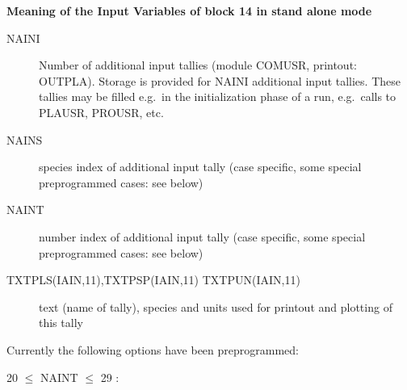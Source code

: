 \textbf{Meaning of the Input Variables of block 14 in stand alone mode}

\medskip 

\begin{description}
  \item[NAINI] Number of additional input tallies (module
        COMUSR, printout:
        OUTPLA).
        Storage is provided for NAINI additional input tallies.
        These tallies may be filled e.g.\ in the initialization phase of a run, e.g.\
        calls to PLAUSR, PROUSR, etc.
  \item[NAINS] species index of additional input
        tally (case specific, some special preprogrammed cases: see below)
  \item[NAINT]
        number index of additional input tally (case specific, some special
        preprogrammed cases: see below)
  \item[TXTPLS(IAIN,11),TXTPSP(IAIN,11)
        TXTPUN(IAIN,11)] text (name of tally), species and units used for printout and
        plotting of this tally
\end{description}
Currently the following options have
been preprogrammed:

20 $\le$ NAINT $\le$ 29 :

